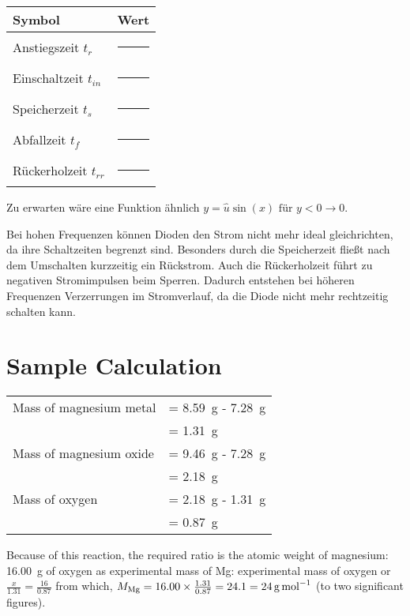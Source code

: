 \documentclass[
	a4paper, %
	12pt, %
]{CSUniSchoolLabReport}
\begin{document}
\vspace{1em} 

\begin{center}
\begin{tabular}{ll}
\toprule
\textbf{Symbol} & \textbf{Wert} \\
\midrule
Anstiegszeit $t_r$       & \rule{3cm}{0.4pt} \\
Einschaltzeit $t_{in}$   & \rule{3cm}{0.4pt} \\
Speicherzeit  $t_s$      & \rule{3cm}{0.4pt} \\
Abfallzeit $t_f$         & \rule{3cm}{0.4pt} \\
Rückerholzeit $t_{rr}$   & \rule{3cm}{0.4pt} \\
\bottomrule
\end{tabular}
\end{center}

\vspace{1em} 

Zu erwarten wäre eine Funktion ähnlich $y = \hat{u}\sin(x) \text{ für } y < 0 \rightarrow 0$.\par
Bei hohen Frequenzen können Dioden den Strom nicht mehr ideal gleichrichten, da ihre Schaltzeiten begrenzt sind. Besonders durch die Speicherzeit fließt nach dem Umschalten kurzzeitig ein Rückstrom. Auch die Rückerholzeit führt zu negativen Stromimpulsen beim Sperren. Dadurch entstehen bei höheren Frequenzen Verzerrungen im Stromverlauf, da die Diode nicht mehr rechtzeitig schalten kann.
\section{Sample Calculation}

\begin{tabular}{ll}
	Mass of magnesium metal & = \SI{8.59}{\gram} - \SI{7.28}{\gram}\\
	& = \SI{1.31}{\gram}\\
	Mass of magnesium oxide & = \SI{9.46}{\gram} - \SI{7.28}{\gram}\\
	& = \SI{2.18}{\gram}\\
	Mass of oxygen & = \SI{2.18}{\gram} - \SI{1.31}{\gram}\\
	& = \SI{0.87}{\gram}
\end{tabular}

Because of this reaction, the required ratio is the atomic weight of magnesium: \SI{16.00}{\gram} of oxygen as experimental mass of Mg: experimental mass of oxygen or $\frac{x}{1.31} = \frac{16}{0.87}$ from which, $M_{\ce{Mg}} = 16.00 \times \frac{1.31}{0.87} = 24.1 = \SI{24}{\gram\per\mole}$ (to two significant figures).
\end{document}
